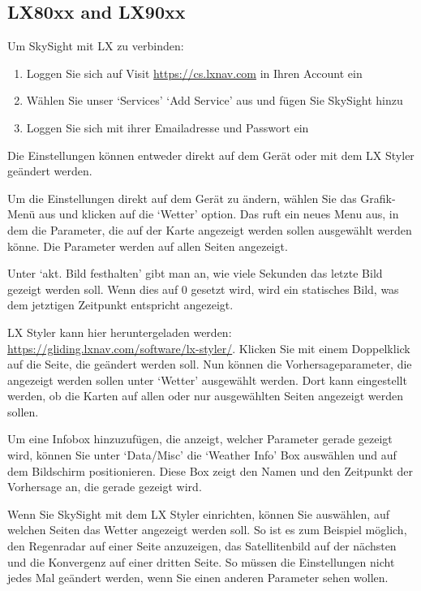 \documentclass[11pt,a4paper]{article}
\begin{document}
\subsection{LX80xx and LX90xx}\label{subsec:lx}
Um SkySight mit LX zu verbinden: 

\begin{enumerate}
\item Loggen Sie sich auf Visit \url{https://cs.lxnav.com} in Ihren Account ein
\item Wählen Sie unser `Services' `Add Service' aus und fügen Sie SkySight hinzu
\item Loggen Sie sich mit ihrer Emailadresse und Passwort ein
\end{enumerate}

Die Einstellungen können entweder direkt auf dem Gerät oder mit dem LX Styler geändert werden.

Um die Einstellungen direkt auf dem Gerät zu ändern, wählen Sie das Grafik-Menü aus und klicken auf die `Wetter' option. Das ruft ein neues Menu aus, in dem die Parameter, die auf der Karte angezeigt werden sollen ausgewählt werden könne. Die Parameter werden auf allen Seiten angezeigt.

\begin{tip}
\item Unter `akt. Bild festhalten' gibt man an, wie viele Sekunden das letzte Bild gezeigt werden soll. Wenn dies auf 0 gesetzt wird, wird ein statisches Bild, was dem jetztigen Zeitpunkt entspricht angezeigt. 
\end{tip}

LX Styler kann hier heruntergeladen werden: \url{https://gliding.lxnav.com/software/lx-styler/}. Klicken Sie mit einem Doppelklick auf die Seite, die geändert werden soll. Nun können die Vorhersageparameter, die angezeigt werden sollen unter `Wetter' ausgewählt werden. Dort kann eingestellt werden, ob die Karten auf allen oder nur ausgewählten Seiten angezeigt werden sollen.

Um eine Infobox hinzuzufügen, die anzeigt, welcher Parameter gerade gezeigt wird, können Sie unter `Data/Misc' die `Weather Info' Box auswählen und auf dem Bildschirm positionieren. Diese Box zeigt den Namen und den Zeitpunkt der Vorhersage an, die gerade gezeigt wird.

Wenn Sie SkySight mit dem LX Styler einrichten, können Sie auswählen, auf welchen Seiten das Wetter angezeigt werden soll. So ist es zum Beispiel möglich, den Regenradar auf einer Seite anzuzeigen, das Satellitenbild auf der nächsten und die Konvergenz auf einer dritten Seite. So müssen die Einstellungen nicht jedes Mal geändert werden, wenn Sie einen anderen Parameter sehen wollen.
\end{document}
